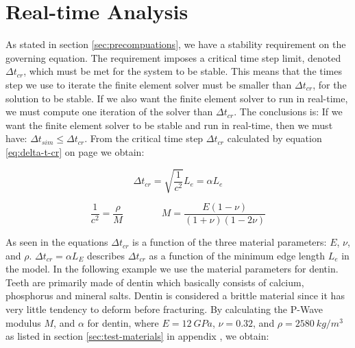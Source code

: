 \section{Real-time Analysis}
\label{sec:realtime_analysis}
As stated in section \vref{sec:precompuations}, we have a stability
requirement on the governing equation. The requirement imposes a
critical time step limit, denoted $\Delta t_{cr}$, which must
be met for the system to be stable.
%
This means that the times step we use to iterate the finite element
solver must be smaller than $\Delta t_{cr}$, for the solution to be
stable.
%
If we also want the finite element solver to run in real-time, we must
compute one iteration of the solver than $\Delta t_{cr}$.
%
The conclusions is: If we want the finite element solver to be
stable and run in real-time, then we must have:
$\Delta t_{sim} \le  \Delta t_{cr}$.
%
%
From the critical time step $\Delta t_{cr}$ calculated by equation
\eqref{eq:delta-t-cr} on page \pageref{eq:delta-t-cr} we
obtain:


\begin{equation*}
\Delta t_{cr} = \sqrt{\frac{1}{c^2}} L_e = \alpha L_e
\end{equation*}

\begin{equation*}
\frac{1}{c^2} = \frac{\rho}{M}
\qquad \qquad
M = \frac{E(1-\nu)}{(1+\nu)(1-2\nu)}
\end{equation*}

As seen in the equations $\Delta t_{cr}$ is a function of the three
material parameters: $E$, $\nu$, and $\rho$.
%
$\Delta t_{cr} = \alpha L_E$ describes $\Delta t_{cr}$ as a function
of the minimum edge length $L_e$ in the
model.
%
%
In the following example we use the material parameters for dentin.
Teeth are primarily made of dentin which basically consists of
calcium, phosphorus and mineral salts. Dentin is considered a
brittle material since it has very little tendency to deform before
fracturing.
%
%
%
%
By calculating the P-Wave modulus $M$, and $\alpha$ for dentin, where
$E=12 \ GPa$, $\nu=0.32$, and $\rho=2580 \ kg/m^3$ as listed in section
\vref{sec:test-materials} in appendix , we obtain:

